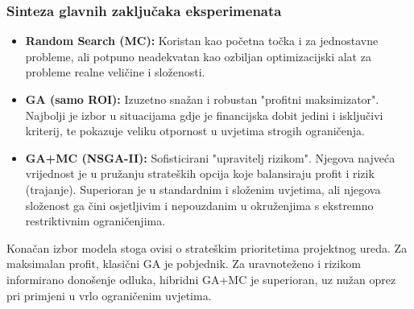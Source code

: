 \subsubsection{Sinteza glavnih zaključaka eksperimenata}
\begin{itemize}
    \item \textbf{Random Search (MC):} Koristan kao početna točka i za jednostavne probleme, ali potpuno neadekvatan kao ozbiljan optimizacijski alat za probleme realne veličine i složenosti.
    \item \textbf{GA (samo ROI):} Izuzetno snažan i robustan "profitni maksimizator". Najbolji je izbor u situacijama gdje je financijska dobit jedini i isključivi kriterij, te pokazuje veliku otpornost u uvjetima strogih ograničenja.
    \item \textbf{GA+MC (NSGA-II):} Sofisticirani "upravitelj rizikom". Njegova najveća vrijednost je u pružanju strateških opcija koje balansiraju profit i rizik (trajanje). Superioran je u standardnim i složenim uvjetima, ali njegova složenost ga čini osjetljivim i nepouzdanim u okruženjima s ekstremno restriktivnim ograničenjima.
\end{itemize}
Konačan izbor modela stoga ovisi o strateškim prioritetima projektnog ureda. Za maksimalan profit, klasični GA je pobjednik. Za uravnoteženo i rizikom informirano donošenje odluka, hibridni GA+MC je superioran, uz nužan oprez pri primjeni u vrlo ograničenim uvjetima.
